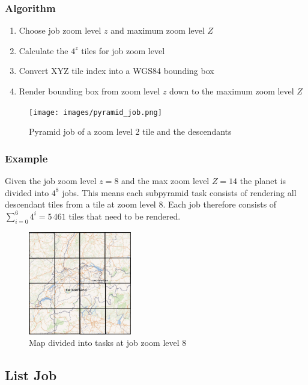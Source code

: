 \subsubsection*{Algorithm}

\begin{enumerate}  
    \item Choose job zoom level $z$ and maximum zoom level $Z$
    \item Calculate the $4^z$ tiles for job zoom level
    \item Convert XYZ tile index into a WGS84 bounding box
    \item Render bounding box from zoom level $z$ down to the maximum zoom level $Z$
\end{enumerate}

\begin{figure}[H]
  \centering
  \texttt{[image: images/pyramid\_job.png]}
  \caption{Pyramid job of a zoom level 2 tile and the descendants}
\end{figure}

\subsubsection*{Example}

Given the job zoom level $z=8$ and the max zoom level $Z=14$ the planet is divided into $4^{8}$ jobs.
This means each subpyramid task consists of rendering all descendant tiles from a tile at zoom level 8.
Each job therefore consists of $\sum_{i=0}^{6} 4^i = 5\,461$ tiles that need to be rendered.  \\

\begin{figure}[H]
  \centering
  \includegraphics[width=0.4\textwidth]{images/switzerland_tiled_z8_small.png}
  \caption{Map divided into tasks at job zoom level 8}
\end{figure}

\subsection{List Job}\label{list-job}

